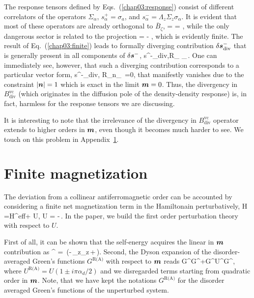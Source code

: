 The response tensors defined by Eqs.~(\ref{chap03:response}) consist of different correlators of the operators $\Sigma_\alpha$, $s^+_\alpha=\sigma_a$, and $s^-_\alpha = \Lambda_z\Sigma_z\sigma_\alpha$. It is evident that most of these operators are already orthogonal to $\bar{B}_\zeta$,
\be
\tr {} = \tr {}= \tr {},
\e
while the only dangerous sector is related to the projection
\be
\label{chap03:finite}
\tr {} = - ,
\e
which is evidently finite. The result of Eq.~(\ref{chap03:finite}) leads to formally diverging contribution $\delta \boldsymbol{s}^-_\textrm{div}$ that is generally present in all components of $\delta \boldsymbol{s}^-$, 
\be
\delta s^{-}_{\textrm{div},\alpha}\propto  R_\infty
\s_\beta {}  \,.
\e
One can immediately see, however, that such a diverging contribution corresponds to a particular vector form,
\be
\label{chap03:divergence}
\delta s^{-}_{\textrm{div},\alpha} \propto R_\infty n_\alpha\, \cdot{} =0,
\e
that manifestly vanishes due to the constraint $|\boldsymbol{n}|=1$ which is exact in the limit $\boldsymbol{m}=0$. Thus, the divergency in $B_\textrm{div}^\textrm{vc}$ (which originates in the diffusion pole of the density-density response) is, in fact, harmless for the response 
tensors we are discussing. 

It is interesting to note that the irrelevance of the divergency in $B_\textrm{div}^\textrm{vc}$ operator extends to higher orders in $\boldsymbol{m}$, even though it becomes much harder to see. We touch on this problem in Appendix~\ref{chap03:sec:appd}. 

\section{Finite magnetization}\label{chap03:sec:appd}
The deviation from a collinear antiferromagnetic order can be accounted by considering a finite net magnetization term in the Hamiltonain perturbatively,
\be
H =H^\textrm{eff}+ U, \qquad U = -\Delta\,\cdot\bb{\sigma}.
\e
In the paper, we build the first order perturbation theory with respect to $U$. 

First of all, it can be shown that the self-energy acquires the linear in $\boldsymbol{m}$ contribution as
\be\label{chap03:chap3:eq:SEcorr}
\im \Sigma^ = \mp{}\,(\ep-\Delta\,\Lambda_z\Sigma_z\,\cdot\bb{\sigma}+\Delta\,\cdot\bb{\sigma}).
\e
Second, the Dyson expansion of the disorder-averaged Green's functions $G^\text{R(A)}$ with respect to $\boldsymbol{m}$ reads
\be
G^\rightarrow G^+G^U^G^,
\e
where $U^\text{R(A)}=U(1 \pm i \pi\alpha_d/2)$ and we disregarded terms starting from quadratic order in $\boldsymbol{m}$. Note, that 
we have kept the notations $G^\text{R(A)}$ for the disorder averaged Green's functions of the unperturbed system. 

